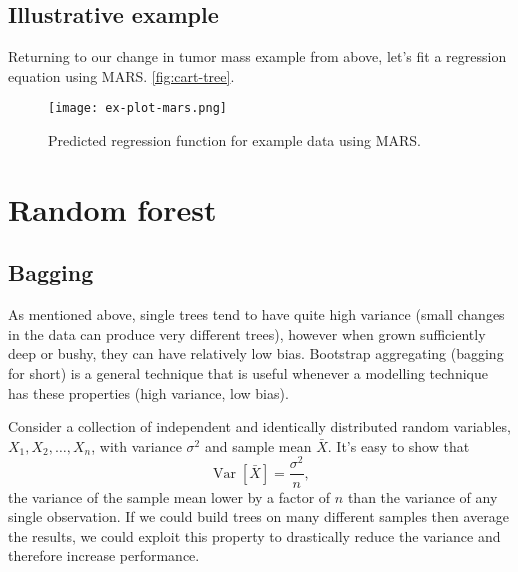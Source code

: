 \documentclass[12pt]{article}
\begin{document}

\subsection{Illustrative example} %
\label{sub:example}

Returning to our change in tumor mass example from above, let's fit a regression equation using MARS.
 \ref{fig:cart-tree}.

\begin{figure}[H]
\begin{center}
\texttt{[image: ex-plot-mars.png]}
\end{center}
\caption[Predicted regression function for example data using MARS]{Predicted regression function for example data using MARS.}
\label{fig:results-int}
\end{figure}



\section{Random forest} %
\label{sec:random_forest}

\subsection{Bagging} %
\label{sub:bagging}

As mentioned above, single trees tend to have quite high variance (small changes in the data can produce very different trees), however when grown sufficiently deep or bushy, they can have relatively low bias. Bootstrap aggregating (bagging for short) is a general technique that is useful whenever a modelling technique has these properties (high variance, low bias). 

Consider a collection of independent and identically distributed random variables, $X_{1}, X_{2}, \ldots, X_{n}$, with variance $\sigma^2$ and sample mean $\bar{X}$. It's easy to show that 
\begin{equation}
  \operatorname{Var}[\bar{X}] = \frac{\sigma^2}{n},
\end{equation}
the variance of the sample mean lower by a factor of $n$ than the variance of any single observation. If we could build trees on many different samples then average the results, we could exploit this property to drastically reduce the variance and therefore increase performance.
\end{document}
